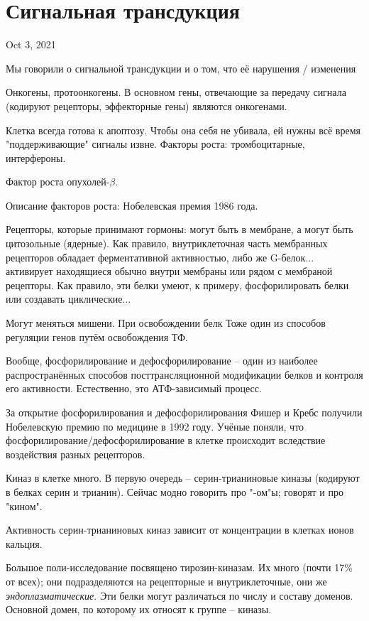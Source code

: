 \documentclass[main.tex]{subfiles}
\begin{document}
\section{Сигнальная трансдукция}
Oct 3, 2021

Мы говорили о сигнальной трансдукции и о том, что её нарушения / изменения

Онкогены, протоонкогены.
В основном гены, отвечающие за передачу сигнала (кодируют рецепторы, эффекторные гены) являются онкогенами.

Клетка всегда готова к апоптозу.
Чтобы она себя не убивала, ей нужны всё время "поддерживающие" сигналы извне.
Факторы роста: тромбоцитарные, интерфероны.

Фактор роста опухолей-$\beta$.

Описание факторов роста: Нобелевская премия 1986 года.

Рецепторы, которые принимают гормоны: могут быть в мембране, а могут быть цитозольные (ядерные).
Как правило, внутриклеточная часть мембранных рецепторов обладает ферментативной активностью, либо же 
G-белок... активирует находящиеся обычно внутри мембраны или рядом с мембраной рецепторы.
Как правило, эти белки умеют, к примеру, фосфорилировать белки или создавать циклические...

Могут меняться мишени.
При освобождении белк %
Тоже один из способов регуляции генов путём освобождения ТФ.

Вообще, фосфорилирование и дефосфорилирование -- один из наиболее распространённых способов посттрансляционной модификации белков и контроля его активности.
Естественно, это АТФ-зависимый процесс.

За открытие фосфорилирования и дефосфорилирования Фишер и Кребс получили Нобелевскую премию по медицине в 1992 году.
Учёные поняли, что фосфорилирование/дефосфорилирование в клетке происходит вследствие воздействия разных рецепторов.

Киназ в клетке много.
В первую очередь -- серин-трианиновые киназы (кодируют в белках серин и трианин).
Сейчас модно говорить про "-ом"ы; говорят и про "кином".

Активность серин-трианиновых киназ зависит от концентрации в клетках ионов кальция.

Большое поли-исследование посвящено тирозин-киназам.
Их много (почти 17\% от всех); они подразделяются на рецепторные и внутриклеточные, они же \emph{эндоплазматические}.
Эти белки могут различаться по числу и составу доменов.
Основной домен, по которому их относят к группе -- киназы.
\end{document}

